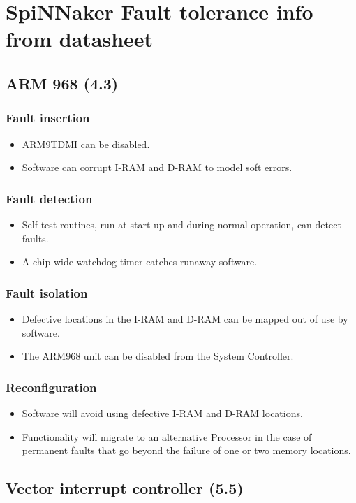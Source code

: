 \documentclass[11pt]{article}
\newenvironment{itmz}{
	\begin{itemize}
		\setlength{\itemsep}{0pt}
		\setlength{\parskip}{0pt}
	}{\end{itemize}}
\begin{document}
\newpage
\section{SpiNNaker Fault tolerance info from datasheet}
\subsection{ARM 968 (4.3)}
\subsubsection*{Fault insertion}
\begin{itmz}
\item ARM9TDMI can be disabled.
\item Software can corrupt I-RAM and D-RAM to model soft errors.
\end{itmz}
\subsubsection*{Fault detection}
\begin{itmz}
\item Self-test routines, run at start-up and during normal operation, can detect faults.
\item A chip-wide watchdog timer catches runaway software.
\end{itmz}
\subsubsection*{Fault isolation}
\begin{itmz}
\item Defective locations in the I-RAM and D-RAM can be mapped out of use by software.
\item The ARM968 unit can be disabled from the System Controller.
\end{itmz}
\subsubsection*{Reconfiguration}
\begin{itmz}
\item Software will avoid using defective I-RAM and D-RAM locations.
\item Functionality will migrate to an alternative Processor in the case of permanent faults that go
beyond the failure of one or two memory locations.
\end{itmz}

\subsection{Vector interrupt controller (5.5)}
\end{document}
